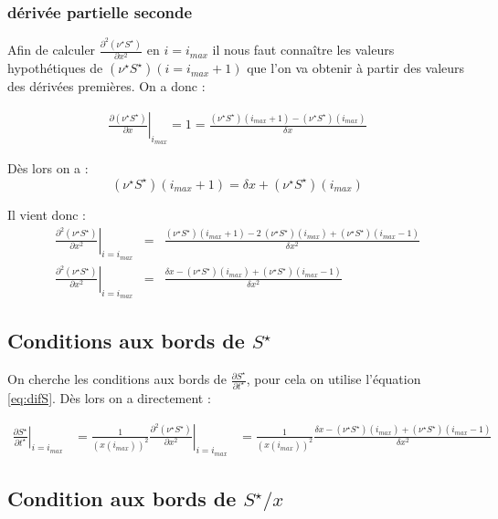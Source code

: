 \subsubsection{dérivée partielle seconde}
Afin de calculer $\frac{\partial^2(\nu^{\star} S^{\star})} {\partial x^2}$ en $i=i_{max}$ il nous faut connaître les valeurs hypothétiques de $(\nu^{\star} S^{\star})(i=i_{max}+1)$ que l'on va obtenir à partir des valeurs des dérivées premières. On a donc :

\begin{eqnarray}
  \left. \frac{\partial (\nu^{\star}S^{\star})}{\partial x} \right|_{i_{max}} = 1 = \frac{(\nu^{\star} S^{\star})(i_{max}+1)-(\nu^{\star}S^{\star})(i_{max})}{\delta x} 
\end{eqnarray}

Dès lors on a : 
\begin{equation}
( \nu^{\star} S^{\star})(i_{max}+1) = \delta x + (\nu^{\star}S^{\star})(i_{max}) 
\end{equation}

Il vient donc :
\begin{eqnarray}
 \left. \frac{\partial^2 (\nu^{\star} S^{\star})}{\partial x^2}\right|_{i=i_{max}} &=& \frac{(\nu^{\star} S^{\star})(i_{max}+1) - 2\ (\nu^{\star} S^{\star})(i_{max}) + (\nu^{\star} S^{\star})(i_{max}-1)}{\delta x^2}\\
 \left. \frac{\partial^2 (\nu^{\star} S^{\star})}{\partial x^2}\right|_{i=i_{max}} &=& \frac{\delta x - (\nu^{\star} S^{\star})(i_{max}) + (\nu^{\star} S^{\star})(i_{max}-1)}{\delta x^2}
\end{eqnarray}

\subsection{Conditions aux bords de $S^{\star}$}
On cherche les conditions aux bords de $\frac{\partial S^{\star}}{\partial t^{\star}}$, pour cela on utilise l'équation \eqref{eq:difS}. Dès lors on a directement :

\begin{eqnarray}
  \left. \frac{\partial S^{\star}}{\partial t^{\star}} \right|_{i=i_{max}}&= \frac{1}{(x(i_{max}))^2} \left. \frac{\partial^2 (\nu^{\star} S^{\star})}{\partial x^2}\right|_{i=i_{max}} &= \frac{1}{(x(i_{max}))^2} \frac{\delta x - (\nu^{\star} S^{\star})(i_{max}) + (\nu^{\star} S^{\star})(i_{max}-1)}{\delta x^2}
\end{eqnarray}


\subsection{Condition aux bords de $S^{\star}/x$}

